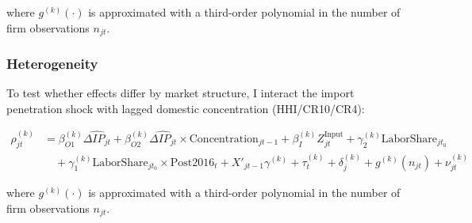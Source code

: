 \documentclass[12pt]{article}
\begin{document}
where $g^{(k)}(\cdot)$ is approximated with a third-order polynomial in the number of firm observations $n_{jt}$.

\subsubsection{Heterogeneity}

To test whether effects differ by market structure, I interact the import penetration shock with lagged domestic concentration (HHI/CR10/CR4):

\begin{equation}
\begin{aligned}
\rho_{jt}^{(k)} &= \beta_{O1}^{(k)} \widehat{\Delta IP_{jt}} + \beta_{O2}^{(k)} \widehat{\Delta IP_{jt}} \times \text{Concentration}_{jt-1} + \beta_I^{(k)} Z_{jt}^{\text{Input}}  + \gamma_2^{(k)} \text{LaborShare}_{jt_0}\\
&\quad + \gamma_1^{(k)} \text{LaborShare}_{jt_0} \times \text{Post2016}_t + X'_{jt-1} \gamma^{(k)} + \tau_t^{(k)} + \delta_j^{(k)} + g^{(k)}(n_{jt}) + \nu_{jt}^{(k)}
\end{aligned}
\tag{6}
\end{equation}

where $g^{(k)}(\cdot)$ is approximated with a third-order polynomial in the number of firm observations $n_{jt}$.
\end{document}

